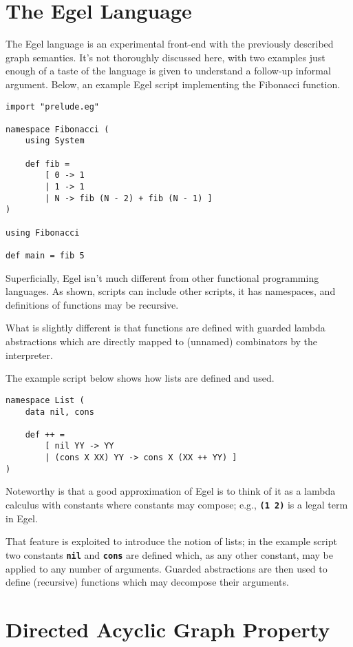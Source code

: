 \documentclass{research4cacm}
\newcommand{\code}[1]{{\bf\texttt{#1}}}
\begin{document}
\section{The Egel Language}

The Egel language is an experimental front-end with the previously
described graph semantics. It's not thoroughly discussed here,
with two examples just enough of a taste of the language is given
to understand a follow-up informal argument.
Below, an example Egel script implementing the Fibonacci function.

\begin{verbatim}
import "prelude.eg"

namespace Fibonacci (
    using System
  
    def fib =
        [ 0 -> 1
        | 1 -> 1
        | N -> fib (N - 2) + fib (N - 1) ]
)

using Fibonacci

def main = fib 5
\end{verbatim}

Superficially, Egel isn't much different from other functional
programming languages. As shown, scripts can include other 
scripts, it has namespaces, and definitions of functions may
be recursive.

What is slightly different is that functions are defined
with guarded lambda abstractions which are directly mapped
to (unnamed) combinators by the interpreter.

The example script below shows how lists are defined and used.

\begin{verbatim}
namespace List (
    data nil, cons

    def ++ =
        [ nil YY -> YY
        | (cons X XX) YY -> cons X (XX ++ YY) ]
)
\end{verbatim}

Noteworthy is that a good approximation of Egel is to think
of it as a lambda calculus with constants where constants
may compose; e.g., \code{(1 2)} is a legal term in Egel.

That feature is exploited to introduce the notion of lists;
in the example script two constants \code{nil} and \code{cons}
are defined which, as any other constant, may be applied 
to any number of arguments. Guarded abstractions are then 
used to define (recursive) functions which may decompose their
arguments.

\section{Directed Acyclic Graph Property}
\end{document}
